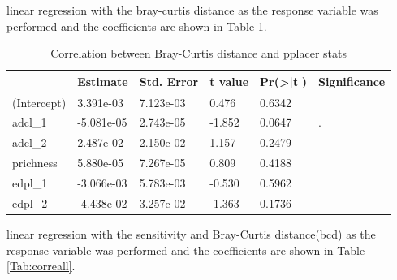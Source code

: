 \documentclass{article}
\begin{document}
linear regression with the bray-curtis distance as the response variable was performed and the coefficients are shown in Table \ref{Tab:correbcd}. \par
\begin{table}[ht]
\caption{Correlation between Bray-Curtis distance and pplacer stats}
\begin{tabular}{llllll}
\hline
            & Estimate &Std. Error &t value &Pr(>|t|) & Significance    \\
            \hline
(Intercept)&  3.391e-03 & 7.123e-03 &  0.476 &  0.6342&  \\
adcl_1     & -5.081e-05 & 2.743e-05 & -1.852 &  0.0647& .\\
adcl_2     &  2.487e-02 & 2.150e-02 &  1.157 &  0.2479&  \\
prichness  &  5.880e-05 & 7.267e-05 &  0.809 &  0.4188&  \\
edpl_1     & -3.066e-03 & 5.783e-03 & -0.530 &  0.5962&  \\
edpl_2     & -4.438e-02 & 3.257e-02 & -1.363 &  0.1736& \\
\hline
\end{tabular}
\label{Tab:correbcd}
\end{table}
linear regression with the sensitivity and Bray-Curtis distance(bcd) as the response variable was performed and the coefficients are shown in Table \ref{Tab:correall}. \par
\end{document}
